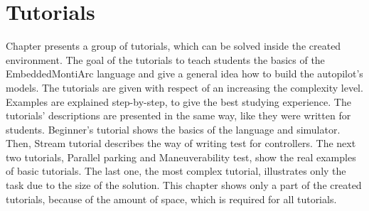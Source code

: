\chapter{Tutorials} \label{sec:tutorials}
Chapter presents a group of tutorials, which can be solved inside the created environment. The goal of the tutorials to teach students the basics of the EmbeddedMontiArc language and give a general idea how to build the autopilot's models. The tutorials are given with respect of an increasing the complexity level. Examples are explained step-by-step, to give the best studying experience. The tutorials' descriptions are presented in the same way, like they were written for students. Beginner's tutorial shows the basics of the language and simulator. Then, Stream tutorial describes the way of writing test for controllers. The next two tutorials, Parallel parking and Maneuverability test, show the real examples of basic tutorials. The last one, the most complex tutorial, illustrates only the task due to the size of the solution. This chapter shows only a part of the created tutorials, because of the amount of space, which is required for all tutorials.

